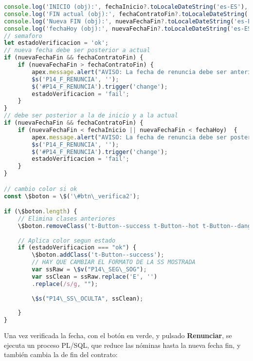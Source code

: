 \begin{lstlisting}[language=JavaScript, caption={Verifica las fecha de renuncia del contrato}]
console.log('INICIO (obj):', fechaInicio?.toLocaleDateString('es-ES'), typeof fechaInicio);
console.log('FIN actual (obj):', fechaContratoFin?.toLocaleDateString('es-ES'), typeof fechaContratoFin);
console.log('Nueva FIN (obj):', nuevaFechaFin?.toLocaleDateString('es-ES'), typeof nuevaFechaFin);
console.log('fechaHoy (obj):', nuevaFechaFin?.toLocaleDateString('es-ES'), typeof fechaHoy);
// semaforo
let estadoVerificacion = 'ok';
// nueva fecha debe ser posterior a actual
if (nuevaFechaFin && fechaContratoFin) {
	if (nuevaFechaFin > fechaContratoFin) {
		apex.message.alert("AVISO: La fecha de renuncia debe ser anterior a la fecha fin actual");
		$s('P14_F_RENUNCIA', '');
		$('#P14_F_RENUNCIA').trigger('change');
		estadoVerificacion = 'fail';
	}
}
// debe ser posterior a la de inicio y a la actual
if (nuevaFechaFin && fechaContratoFin) {
	if (nuevaFechaFin < fechaInicio || nuevaFechaFin < fechaHoy)  {
		apex.message.alert("AVISO: La fecha de renuncia debe ser posterior a la fecha actual");
		$s('P14_F_RENUNCIA', '');
		$('#P14_F_RENUNCIA').trigger('change');
		estadoVerificacion = 'fail';
	}
}

// cambio color si ok
const \$boton = \$('\#btn\_verifica2');

if (\$boton.length) {
	// Elimina clases anteriores
	\$boton.removeClass('t-Button--success t-Button--hot t-Button--danger');
	
	// Aplica color segun estado
	if (estadoVerificacion === "ok") {
		\$boton.addClass('t-Button--success');
		// HAY QUE CAMBIAR EL FORMATO DE LA SS MOSTRADA
		var ssRaw = \$v("P14\_SEG\_SOG");                    
		var ssClean = ssRaw.replace('E', '')            
		.replace(/s/g, "");     
		
		\$s("P14\_SS\_OCULTA", ssClean);
		
	}
}
\end{lstlisting}

Una vez verificada la fecha, con el botón en verde, y pulsado \textbf{Renunciar}, se ejecuta un proceso \acrshort{PL/SQL}, que reduce las nóminas hasta la nueva fecha fin, y también cambia la de fin del contrato:

